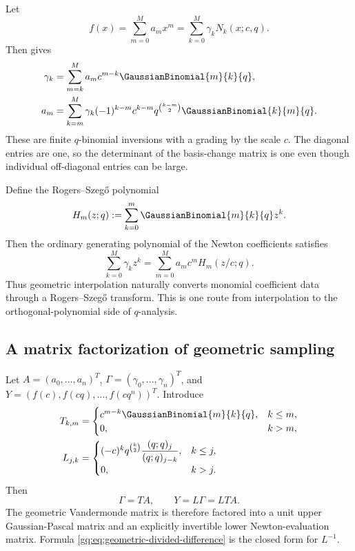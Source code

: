 Let
\begin{equation}
 f(x)=\sum_{m=0}^M a_mx^m
     =\sum_{k=0}^M\gamma_kN_k(x;c,q).
 \label{gq:eq:two-coordinate-expansions}
\end{equation}
Then  gives
\begin{align}
 \gamma_k
 &=\sum_{m=k}^M a_mc^{m-k}\GaussianBinomial{m}{k}{q},
 \label{gq:eq:coeff-forward}\\
 a_m
 &=\sum_{k=m}^M\gamma_k(-1)^{k-m}c^{k-m}
 q^{\binom{k-m}{2}}\GaussianBinomial{k}{m}{q}.
 \label{gq:eq:coeff-inverse}
\end{align}
These are finite $q$-binomial inversions with a grading by the scale $c$.
The diagonal entries are one, so the determinant of the basis-change matrix
is one even though individual off-diagonal entries can be large.

Define the Rogers--Szeg\H{o} polynomial
\begin{equation}
 H_m(z;q):=\sum_{k=0}^m\GaussianBinomial{m}{k}{q}z^k.
 \label{gq:eq:rogers-szego}
\end{equation}
Then the ordinary generating polynomial of the Newton coefficients satisfies
\begin{equation}
 \sum_{k=0}^M\gamma_kz^k
 =\sum_{m=0}^Ma_mc^mH_m(z/c;q).
 \label{gq:eq:rogers-szego-transform}
\end{equation}
Thus geometric interpolation naturally converts monomial coefficient data
through a Rogers--Szeg\H{o} transform.  This is one route from interpolation
to the orthogonal-polynomial side of $q$-analysis.

\subsection{A matrix factorization of geometric sampling}

Let $A=(a_0,\ldots,a_n)^T$, $\Gamma=(\gamma_0,\ldots,\gamma_n)^T$, and
$Y=(f(c),f(cq),\ldots,f(cq^n))^T$.  Introduce
\begin{align*}
 T_{k,m}&=\begin{cases}c^{m-k}\GaussianBinomial{m}{k}{q},&k\le m,\\0,&k>m,\end{cases}\\
 L_{j,k}&=\begin{cases}
 (-c)^kq^{\binom k2}\dfrac{(q;q)_j}{(q;q)_{j-k}},&k\le j,\\
 0,&k>j.
 \end{cases}
\end{align*}
Then
\begin{equation}
 \Gamma=TA,
 \qquad
 Y=L\Gamma=LTA.
 \label{gq:eq:vandermonde-factorization}
\end{equation}
The geometric Vandermonde matrix is therefore factored into a unit upper
Gaussian-Pascal matrix and an explicitly invertible lower Newton-evaluation
matrix.  Formula \eqref{gq:eq:geometric-divided-difference} is the closed form
for $L^{-1}$.

